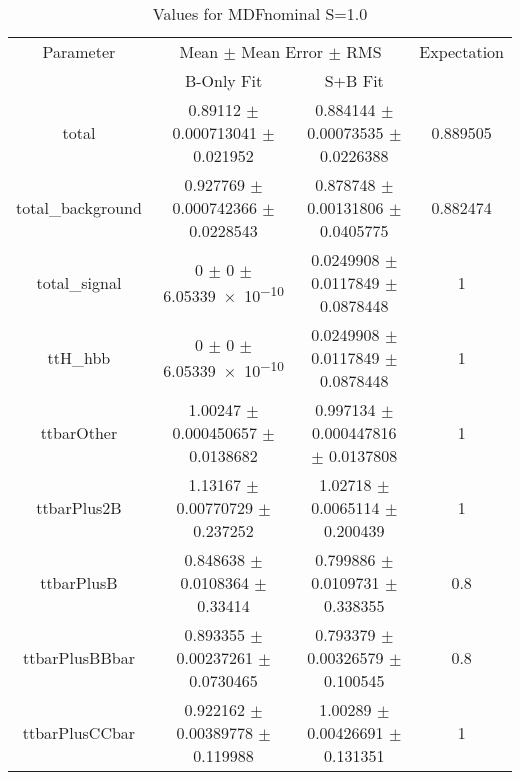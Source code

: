 \begin{table}
\centering
\caption{Values for MDFnominal S=1.0}
\begin{tabular}{cccc}
\toprule
Parameter & \multicolumn{2}{c}{Mean $\pm$ Mean Error $\pm$ RMS} & Expectation\\
 & B-Only Fit & S+B Fit & \\
\midrule
total & \num{0.89112} $\pm$ \num{0.000713041} $\pm$ \num{0.021952} & \num{0.884144} $\pm$ \num{0.00073535} $\pm$ \num{0.0226388} & \num{0.889505}\\
total\_background & \num{0.927769} $\pm$ \num{0.000742366} $\pm$ \num{0.0228543} & \num{0.878748} $\pm$ \num{0.00131806} $\pm$ \num{0.0405775} & \num{0.882474}\\
total\_signal & \num{0} $\pm$ \num{0} $\pm$ \num{6.05339e-10} & \num{0.0249908} $\pm$ \num{0.0117849} $\pm$ \num{0.0878448} & \num{1}\\
ttH\_hbb & \num{0} $\pm$ \num{0} $\pm$ \num{6.05339e-10} & \num{0.0249908} $\pm$ \num{0.0117849} $\pm$ \num{0.0878448} & \num{1}\\
ttbarOther & \num{1.00247} $\pm$ \num{0.000450657} $\pm$ \num{0.0138682} & \num{0.997134} $\pm$ \num{0.000447816} $\pm$ \num{0.0137808} & \num{1}\\
ttbarPlus2B & \num{1.13167} $\pm$ \num{0.00770729} $\pm$ \num{0.237252} & \num{1.02718} $\pm$ \num{0.0065114} $\pm$ \num{0.200439} & \num{1}\\
ttbarPlusB & \num{0.848638} $\pm$ \num{0.0108364} $\pm$ \num{0.33414} & \num{0.799886} $\pm$ \num{0.0109731} $\pm$ \num{0.338355} & \num{0.8}\\
ttbarPlusBBbar & \num{0.893355} $\pm$ \num{0.00237261} $\pm$ \num{0.0730465} & \num{0.793379} $\pm$ \num{0.00326579} $\pm$ \num{0.100545} & \num{0.8}\\
ttbarPlusCCbar & \num{0.922162} $\pm$ \num{0.00389778} $\pm$ \num{0.119988} & \num{1.00289} $\pm$ \num{0.00426691} $\pm$ \num{0.131351} & \num{1}\\
\bottomrule
\end{tabular}
\end{table}